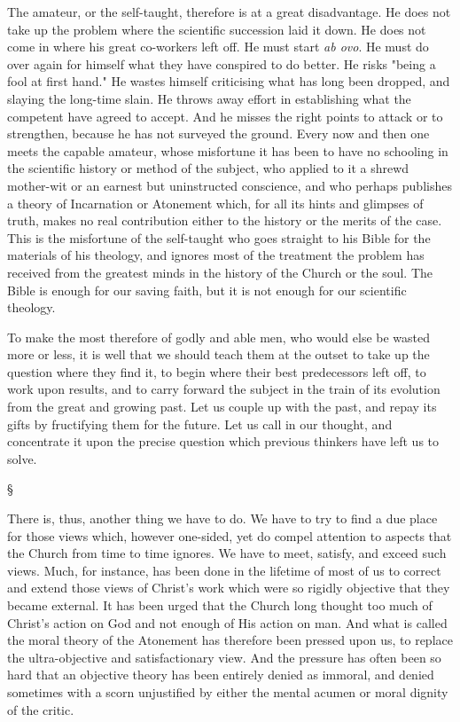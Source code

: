 \documentclass[12pt,a5paper,twoside,titlepage]{book}
\begin{document}
The amateur, or the self-taught, therefore is 
at a great disadvantage. He does not take up 
the problem where the scientific succession laid 
it down. He does not come in where his great 
co-workers left off. He must start \textit{ab ovo}. He 
must do over again for himself what they have 
conspired to do better. He risks "being a fool 
at first hand." He wastes himself criticising 
what has long been dropped, and slaying the 
long-time slain. He throws away effort in 
establishing what the competent have agreed 
to accept. And he misses the right points to 
attack or to strengthen, because he has not surveyed 
the ground. Every now and then one 
meets the capable amateur, whose misfortune 
it has been to have no schooling in the scientific 
history or method of the subject, who applied 
to it a shrewd mother-wit or an earnest but 
uninstructed conscience, and who perhaps publishes 
a theory of Incarnation or Atonement 
which, for all its hints and glimpses of truth, 
makes no real contribution either to the history 
or the merits of the case. This is the misfortune 
of the self-taught who goes straight 
to his Bible for the materials of his theology, 
and ignores most of the treatment the problem 
has received from the greatest minds in the 
history of the Church or the soul. The Bible 
is enough for our saving faith, but it is not 
enough for our scientific theology. 

To make the most therefore of godly and 
able men, who would else be wasted more or 
less, it is well that we should teach them at 
the outset to take up the question where they 
find it, to begin where their best predecessors 
left off, to work upon results, and to carry 
forward the subject in the train of its evolution 
from the great and growing past. Let us couple 
up with the past, and repay its gifts by fructifying 
them for the future. Let us call in our 
thought, and concentrate it upon the precise 
question which previous thinkers have left us 
to solve. 

\begin{center}
\S
\end{center}

There is, thus, another thing we have to do. 
We have to try to find a due place for those views 
which, however one-sided, yet do compel attention 
to aspects that the Church from time to time 
ignores. We have to meet, satisfy, and exceed 
such views. Much, for instance, has been done in 
the lifetime of most of us to correct and extend 
those views of Christ's work which were so 
rigidly objective that they became external. It 
has been urged that the Church long thought 
too much of Christ's action on God and not 
enough of His action on man. And what is 
called the moral theory of the Atonement has 
therefore been pressed upon us, to replace the 
ultra-objective and satisfactionary view. And 
the pressure has often been so hard that an objective 
theory has been entirely denied as immoral, 
and denied sometimes with a scorn unjustified 
by either the mental acumen or moral dignity 
of the critic. 
\end{document}
